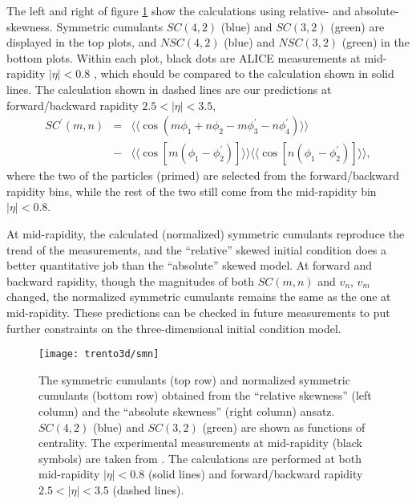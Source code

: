 The left and right of figure \ref{fig:trento:smn} show the calculations using relative- and absolute-skewness.
Symmetric cumulants $SC(4,2)$ (blue) and $SC(3,2)$ (green) are displayed in the top plots, and $NSC(4,2)$ (blue) and $NSC(3,2)$ (green) in the bottom plots.
Within each plot, black dots are ALICE measurements at mid-rapidity $|\eta|<0.8$ \cite{ALICE:2016kpq}, which should be compared to the calculation shown in solid lines.
The calculation shown in dashed lines are our predictions at forward/backward rapidity $2.5 < |\eta| < 3.5$,
\begin{eqnarray}
SC^\prime(m, n) &=& \langle\langle \cos(m\phi_1+n\phi_2-m\phi_3^\prime-n\phi_4^\prime)\rangle\rangle \\
\nonumber &-& \langle\langle\cos[m(\phi_1-\phi_2^\prime)]\rangle\rangle\langle\langle\cos[n(\phi_1-\phi_2^\prime)]\rangle\rangle, \label{eq:scmn-diff}
\end{eqnarray}
where the two of the particles (primed) are selected from the forward/backward rapidity bins, while the rest of the two still come from the mid-rapidity bin $|\eta|<0.8$.

At mid-rapidity, the calculated (normalized) symmetric cumulants reproduce the trend of the measurements, and the ``relative'' skewed initial condition does a better quantitative job than the ``absolute'' skewed model.
At forward and backward rapidity, though the magnitudes of both $SC(m,n)$ and $v_n$, $v_m$ changed, the normalized symmetric cumulants remains the same as the one at mid-rapidity.
These predictions can be checked in future measurements to put further constraints on the three-dimensional initial condition model.

\begin{figure}
\singlespacing 
\texttt{[image: trento3d/smn]}
\caption[The symmetric cumulants (top row) and normalized symmetric]{The symmetric cumulants (top row) and normalized symmetric cumulants (bottom row) obtained from the ``relative skewness'' (left column) and the ``absolute skewness'' (right column) ansatz.
$SC(4,2)$ (blue) and $SC(3,2)$ (green) are shown as functions of centrality. The experimental measurements at mid-rapidity (black symbols) are taken from \cite{ALICE:2016kpq}.
The calculations are performed at both mid-rapidity $|\eta|<0.8$ (solid lines) and forward/backward rapidity $2.5<|\eta|<3.5$ (dashed lines).
}
\label{fig:trento:smn} 
\end{figure}

